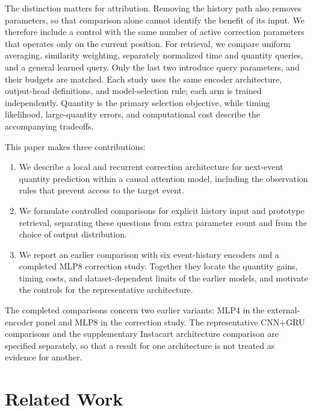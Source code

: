 \documentclass[runningheads]{llncs}
\begin{document}
The distinction matters for attribution. Removing the history path also removes parameters, so that comparison alone cannot identify the benefit of its input. We therefore include a control with the same number of active correction parameters that operates only on the current position. For retrieval, we compare uniform averaging, similarity weighting, separately normalized time and quantity queries, and a general learned query. Only the last two introduce query parameters, and their budgets are matched. Each study uses the same encoder architecture, output-head definitions, and model-selection rule; each arm is trained independently. Quantity is the primary selection objective, while timing likelihood, large-quantity errors, and computational cost describe the accompanying tradeoffs.

This paper makes three contributions:
\begin{enumerate}
\item We describe a local and recurrent correction architecture for next-event quantity prediction within a causal attention model, including the observation rules that prevent access to the target event.
\item We formulate controlled comparisons for explicit history input and prototype retrieval, separating these questions from extra parameter count and from the choice of output distribution.
\item We report an earlier comparison with six event-history encoders and a completed MLP8 correction study. Together they locate the quantity gains, timing costs, and dataset-dependent limits of the earlier models, and motivate the controls for the representative architecture.
\end{enumerate}
The completed comparisons concern two earlier variants: MLP4 in the external-encoder panel and MLP8 in the correction study. The representative CNN+GRU comparisons and the supplementary Instacart architecture comparison are specified separately, so that a result for one architecture is not treated as evidence for another.

\section{Related Work}
\end{document}
